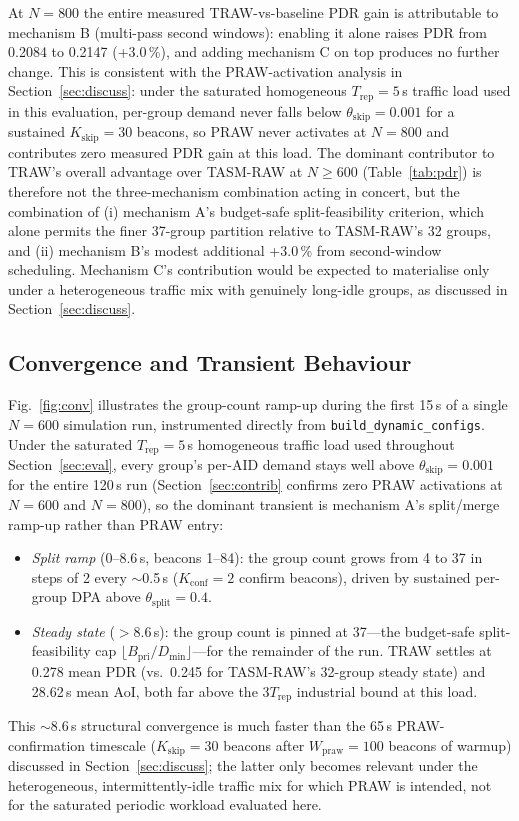 \documentclass[journal]{IEEEtran}
\begin{document}
At $N\!=\!800$ the entire measured TRAW-vs-baseline PDR gain is
attributable to mechanism B (multi-pass second windows): enabling it
alone raises PDR from 0.2084 to 0.2147 (+3.0\,\%), and adding mechanism
C on top produces no further change.
This is consistent with the PRAW-activation analysis in
Section~\ref{sec:discuss}: under the saturated homogeneous $T_\mathrm{rep}\!=\!5$\,s
traffic load used in this evaluation, per-group demand never falls
below $\theta_\mathrm{skip}\!=\!0.001$ for a sustained
$K_\mathrm{skip}\!=\!30$ beacons, so PRAW never activates at
$N\!=\!800$ and contributes zero measured PDR gain at this load.
The dominant contributor to TRAW's overall advantage over TASM-RAW at
$N\!\geq\!600$ (Table~\ref{tab:pdr}) is therefore not the three-mechanism
combination acting in concert, but the combination of (i) mechanism A's
budget-safe split-feasibility criterion, which alone permits the finer
37-group partition relative to TASM-RAW's 32 groups, and (ii) mechanism
B's modest additional +3.0\,\% from second-window scheduling.
Mechanism C's contribution would be expected to materialise only under
a heterogeneous traffic mix with genuinely long-idle groups, as
discussed in Section~\ref{sec:discuss}.

\subsection{Convergence and Transient Behaviour}

Fig.~\ref{fig:conv} illustrates the group-count ramp-up during the
first 15\,s of a single $N\!=\!600$ simulation run, instrumented
directly from \texttt{build\_dynamic\_configs}.
Under the saturated $T_\mathrm{rep}\!=\!5$\,s homogeneous traffic load
used throughout Section~\ref{sec:eval}, every group's per-AID demand stays
well above $\theta_\mathrm{skip}\!=\!0.001$ for the entire 120\,s run
(Section~\ref{sec:contrib} confirms zero PRAW activations at $N\!=\!600$ and
$N\!=\!800$), so the dominant transient is mechanism A's split/merge
ramp-up rather than PRAW entry:
\begin{itemize}
  \item \emph{Split ramp} (0--8.6\,s, beacons 1--84): the group count
        grows from 4 to 37 in steps of 2 every $\sim$0.5\,s
        ($K_\mathrm{conf}\!=\!2$ confirm beacons), driven by sustained
        per-group DPA above $\theta_\mathrm{split}\!=\!0.4$.
  \item \emph{Steady state} ($\!>$8.6\,s): the group count is pinned at
        37---the budget-safe split-feasibility cap
        $\lfloor B_\mathrm{pri}/D_\mathrm{min}\rfloor$---for the
        remainder of the run. TRAW settles at 0.278 mean PDR (vs.\
        0.245 for TASM-RAW's 32-group steady state) and 28.62\,s mean
        AoI, both far above the $3T_\mathrm{rep}$ industrial bound at
        this load.
\end{itemize}
This $\sim$8.6\,s structural convergence is much faster than the
65\,s PRAW-confirmation timescale ($K_\mathrm{skip}\!=\!30$ beacons
after $W_\mathrm{praw}\!=\!100$ beacons of warmup) discussed in
Section~\ref{sec:discuss}; the latter only becomes relevant under the
heterogeneous, intermittently-idle traffic mix for which PRAW is
intended, not for the saturated periodic workload evaluated here.
\end{document}
